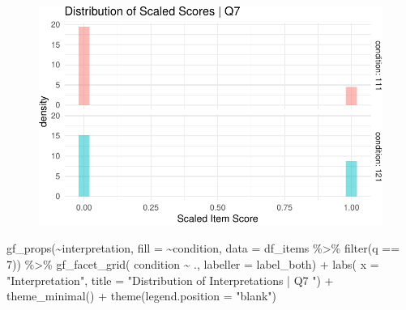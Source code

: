 \documentclass[
  letterpaper,
  DIV=11,
  numbers=noendperiod]{scrreprt}
\newenvironment{Shaded}{\begin{snugshade}}{\end{snugshade}}
\newcommand{\AttributeTok}[1]{\textcolor[rgb]{0.40,0.45,0.13}{#1}}
\newcommand{\DecValTok}[1]{\textcolor[rgb]{0.68,0.00,0.00}{#1}}
\newcommand{\FunctionTok}[1]{\textcolor[rgb]{0.28,0.35,0.67}{#1}}
\newcommand{\NormalTok}[1]{\textcolor[rgb]{0.00,0.23,0.31}{#1}}
\newcommand{\SpecialCharTok}[1]{\textcolor[rgb]{0.37,0.37,0.37}{#1}}
\newcommand{\StringTok}[1]{\textcolor[rgb]{0.13,0.47,0.30}{#1}}
\begin{document}
\begin{figure}[H]

{\centering \includegraphics{analysis/SGC3A/2_sgc3A_scoring_files/figure-pdf/Q7-distribution-1.pdf}

}

\end{figure}

\begin{Shaded}
\begin{Highlighting}[]
\FunctionTok{gf\_props}\NormalTok{(}\SpecialCharTok{\textasciitilde{}}\NormalTok{interpretation, }\AttributeTok{fill =} \SpecialCharTok{\textasciitilde{}}\NormalTok{condition, }\AttributeTok{data =}\NormalTok{ df\_items }\SpecialCharTok{\%\textgreater{}\%} \FunctionTok{filter}\NormalTok{(q }\SpecialCharTok{==} \DecValTok{7}\NormalTok{)) }\SpecialCharTok{\%\textgreater{}\%} 
  \FunctionTok{gf\_facet\_grid}\NormalTok{( condition }\SpecialCharTok{\textasciitilde{}}\NormalTok{ ., }\AttributeTok{labeller =}\NormalTok{ label\_both) }\SpecialCharTok{+} 
  \FunctionTok{labs}\NormalTok{( }\AttributeTok{x =} \StringTok{"Interpretation"}\NormalTok{, }\AttributeTok{title =} \StringTok{"Distribution of Interpretations | Q7 "}\NormalTok{) }\SpecialCharTok{+} 
  \FunctionTok{theme\_minimal}\NormalTok{() }\SpecialCharTok{+} \FunctionTok{theme}\NormalTok{(}\AttributeTok{legend.position =} \StringTok{"blank"}\NormalTok{)}
\end{Highlighting}
\end{Shaded}
\end{document}
